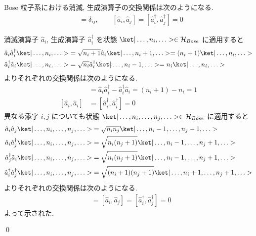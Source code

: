 \documentclass[uplatex,dvipdfmx,a4paper,11pt]{jlreq}
\makeatletter
\newcommand{\HH}{\mathcal{H}}
\numberwithin{equation}{section}
\theoremstyle{definition}
\renewenvironment{proof}[1][\proofname]{\par
  \normalfont
  \topsep6\p@\@plus6\p@ \trivlist
  \item[\hskip\labelsep{\bfseries #1}\@addpunct{\bfseries}]\ignorespaces\quad\par
}{
  \qed\endtrivlist\@endpefalse
}
\renewcommand\proofname{証明}
\makeatother
\begin{document}
\begin{proposition}
  Bose 粒子系における消滅, 生成演算子の交換関係は次のようになる.
  \begin{align}
    [\hat{a}_i, \hat{a}_j^\dagger] & = \delta_{ij}, \qquad [\hat{a}_i, \hat{a}_j] = [\hat{a}_i^\dagger, \hat{a}_j^\dagger] = 0
  \end{align}
\end{proposition}
\begin{proof}
  消滅演算子 $\hat{a}_i$, 生成演算子 $\hat{a}_i^\dagger$ を状態 $\ket|\ldots,n_i,\ldots>\in\HH_{Bose}$ に適用すると
  \begin{align}
    \hat{a}_i\hat{a}_i^\dagger\ket|\ldots,n_i,\ldots> & = \sqrt{n_i + 1}\hat{a}_i\ket|\ldots,n_i+1,\ldots> = (n_i + 1)\ket|\ldots,n_i,\ldots> \\
    \hat{a}_i^\dagger\hat{a}_i\ket|\ldots,n_i,\ldots> & = \sqrt{n_i}\hat{a}_i^\dagger\ket|\ldots,n_i-1,\ldots> = n_i\ket|\ldots,n_i,\ldots>
  \end{align}
  よりそれぞれの交換関係は次のようになる.
  \begin{align}
    [\hat{a}_i, \hat{a}_i^\dagger] & = \hat{a}_i\hat{a}_i^\dagger - \hat{a}_i^\dagger\hat{a}_i = (n_i + 1) - n_i = 1 \\
    [\hat{a}_i, \hat{a}_i]         & = [\hat{a}_i^\dagger, \hat{a}_i^\dagger] = 0
  \end{align}
  異なる添字 $i, j$ についても状態 $\ket|\ldots,n_i,\ldots,n_j,\ldots>\in\HH_{Bose}$ に適用すると
  \begin{align}
    \hat{a}_i\hat{a}_j\ket|\ldots,n_i,\ldots,n_j,\ldots>                 & = \sqrt{n_in_j}\ket|\ldots,n_i-1,\ldots,n_j-1,\ldots>             \\
    \hat{a}_i\hat{a}_j^\dagger\ket|\ldots,n_i,\ldots,n_j,\ldots>         & = \sqrt{n_i(n_j + 1)}\ket|\ldots,n_i-1,\ldots,n_j+1,\ldots>       \\
    \hat{a}_j^\dagger\hat{a}_i\ket|\ldots,n_i,\ldots,n_j,\ldots>         & = \sqrt{n_i(n_j + 1)}\ket|\ldots,n_i-1,\ldots,n_j+1,\ldots>       \\
    \hat{a}_i^\dagger\hat{a}_j^\dagger\ket|\ldots,n_i,\ldots,n_j,\ldots> & = \sqrt{(n_i + 1)(n_j + 1)}\ket|\ldots,n_i+1,\ldots,n_j+1,\ldots>
  \end{align}
  よりそれぞれの交換関係は次のようになる.
  \begin{align}
    [\hat{a}_i, \hat{a}_j^\dagger] & = [\hat{a}_i, \hat{a}_j] = [\hat{a}_i^\dagger, \hat{a}_j^\dagger] = 0
  \end{align}
  よって示された.
\end{proof}
\end{document}
